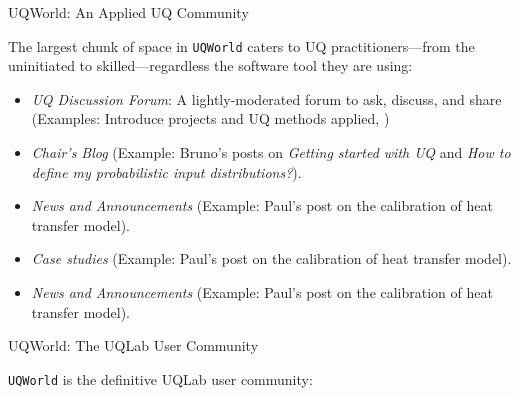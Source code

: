\documentclass[]{rsuqbeamernew}
\begin{document}
\begin{frame}[t]{UQWorld: An Applied UQ Community}
  
The largest chunk of space in \texttt{UQWorld} caters to UQ practitioners---from the uninitiated to skilled---regardless the software tool they are using:

\begin{itemize}
  \item \emph{UQ Discussion Forum}: A lightly-moderated forum to ask, discuss, and share (Examples: Introduce projects and UQ methods applied, )
  \item \emph{Chair's Blog} (Example: Bruno's posts on \emph{Getting started with UQ} and \emph{How to define my probabilistic input distributions?}).
  \item \emph{News and Announcements} (Example: Paul's post on the calibration of heat transfer model).
  \item \emph{Case studies} (Example: Paul's post on the calibration of heat transfer model).
  \item \emph{News and Announcements} (Example: Paul's post on the calibration of heat transfer model).
\end{itemize}

\end{frame}

\begin{frame}[t]{UQWorld: The UQLab User Community}
  
\texttt{UQWorld} is the definitive UQLab user community:

\end{frame}
\end{document}
